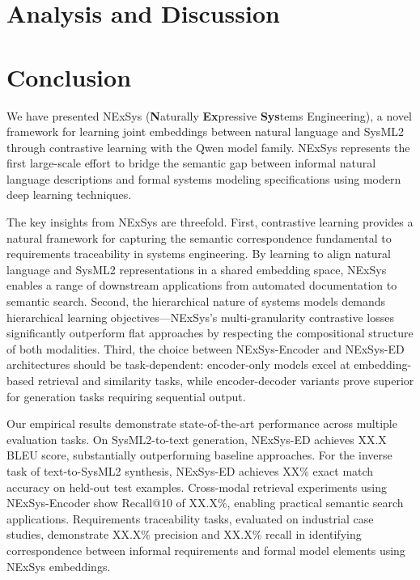 \documentclass{article}
\begin{document}
\section{Analysis and Discussion}
\label{sec:analysis}


\section{Conclusion}
\label{sec:conclusion}

We have presented NExSys (\textbf{N}aturally \textbf{Ex}pressive \textbf{Sys}tems Engineering), a novel framework for learning joint embeddings between natural language and SysML2 through contrastive learning with the Qwen model family. NExSys represents the first large-scale effort to bridge the semantic gap between informal natural language descriptions and formal systems modeling specifications using modern deep learning techniques.

The key insights from NExSys are threefold. First, contrastive learning provides a natural framework for capturing the semantic correspondence fundamental to requirements traceability in systems engineering. By learning to align natural language and SysML2 representations in a shared embedding space, NExSys enables a range of downstream applications from automated documentation to semantic search. Second, the hierarchical nature of systems models demands hierarchical learning objectives—NExSys's multi-granularity contrastive losses significantly outperform flat approaches by respecting the compositional structure of both modalities. Third, the choice between NExSys-Encoder and NExSys-ED architectures should be task-dependent: encoder-only models excel at embedding-based retrieval and similarity tasks, while encoder-decoder variants prove superior for generation tasks requiring sequential output.

Our empirical results demonstrate state-of-the-art performance across multiple evaluation tasks. On SysML2-to-text generation, NExSys-ED achieves XX.X BLEU score, substantially outperforming baseline approaches. For the inverse task of text-to-SysML2 synthesis, NExSys-ED achieves XX\% exact match accuracy on held-out test examples. Cross-modal retrieval experiments using NExSys-Encoder show Recall@10 of XX.X\%, enabling practical semantic search applications. Requirements traceability tasks, evaluated on industrial case studies, demonstrate XX.X\% precision and XX.X\% recall in identifying correspondence between informal requirements and formal model elements using NExSys embeddings.
\end{document}
